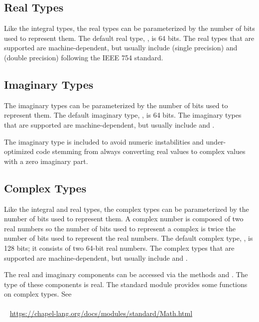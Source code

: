 \subsection{Real Types}
\label{Real_Types}

Like the integral types, the real types can be parameterized by the
number of bits used to represent them.  The default real
type, , is 64 bits.  The real types that are supported are
machine-dependent, but usually include  (single
precision) and  (double precision) following the IEEE
754 standard.  

\subsection{Imaginary Types}
\label{Imaginary_Types}

The imaginary types can be parameterized by the number of bits used to
represent them.  The default imaginary type, , is 64 bits.
The imaginary types that are supported are machine-dependent, but
usually include  and .

\begin{rationale}
The imaginary type is included to avoid numeric instabilities and
under-optimized code stemming from always converting real values to
complex values with a zero imaginary part.
\end{rationale}

\subsection{Complex Types}
\label{Complex_Types}

Like the integral and real types, the complex types can be
parameterized by the number of bits used to represent them.  A complex
number is composed of two real numbers so the number of bits used to
represent a complex is twice the number of bits used to represent the
real numbers.  The default complex type, , is 128 bits;
it consists of two 64-bit real numbers.  The complex types that are
supported are machine-dependent, but usually
include  and .

The real and imaginary components can be accessed via the methods
 and .  The type of these components is real.
The standard  module provides some functions on
complex types. See
\\ %
\mbox{$$ $$ $$ $$ $$} %
\url{https://chapel-lang.org/docs/modules/standard/Math.html}

